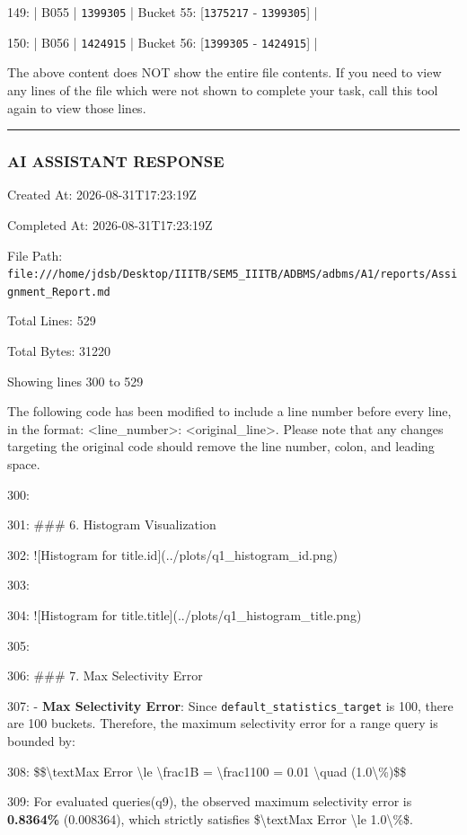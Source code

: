 \documentclass[11pt,a4paper]{article}
\begin{document}
149: | B055 | \texttt{1399305} | Bucket 55: [\texttt{1375217} - \texttt{1399305}] |

150: | B056 | \texttt{1424915} | Bucket 56: [\texttt{1399305} - \texttt{1424915}] |

The above content does NOT show the entire file contents. If you need to view any lines of the file which were not shown to complete your task, call this tool again to view those lines.


\hrule

\subsubsection{AI ASSISTANT RESPONSE}

Created At: 2026-08-31T17:23:19Z

Completed At: 2026-08-31T17:23:19Z

File Path: \texttt{file:///home/jdsb/Desktop/IIITB/SEM5\_IIITB/ADBMS/adbms/A1/reports/Assignment\_Report.md}

Total Lines: 529

Total Bytes: 31220

Showing lines 300 to 529

The following code has been modified to include a line number before every line, in the format: <line\_number>: <original\_line>. Please note that any changes targeting the original code should remove the line number, colon, and leading space.

300:

301: \#\#\# 6. Histogram Visualization

302: ![Histogram for title.id](../plots/q1\_histogram\_id.png)

303:

304: ![Histogram for title.title](../plots/q1\_histogram\_title.png)

305:

306: \#\#\# 7. Max Selectivity Error

307: - \textbf{Max Selectivity Error}: Since \texttt{default\_statistics\_target} is 100, there are 100 buckets. Therefore, the maximum selectivity error for a range query is bounded by:

308: \$\$\textbackslash{}text{Max Error} \textbackslash{}le \textbackslash{}frac{1}{B} = \textbackslash{}frac{1}{100} = 0.01 \textbackslash{}quad (1.0\textbackslash{}\%)\$\$

309: For evaluated queries(q9), the observed maximum selectivity error is \textbf{0.8364\%} (0.008364), which strictly satisfies \$\textbackslash{}text{Max Error} \textbackslash{}le 1.0\textbackslash{}\%\$.
\end{document}
